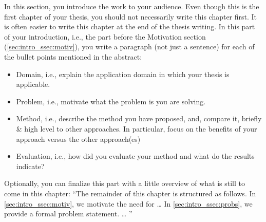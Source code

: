 In this section, you introduce the work to your audience.
Even though this is the first chapter of your thesis, you should not necessarily write this chapter first.
It is often easier to write this chapter at the end of the thesis writing.
In this part of your introduction, i.e., the part before the Motivation section (\autoref{sec:intro_ssec:motiv}), you write a paragraph (not just a sentence) for each of the bullet points mentioned in the abstract:

\begin{itemize}
	\item Domain, i.e., explain the application domain in which your thesis is applicable.
	\item Problem, i.e., motivate what the problem is you are solving.
	\item Method, i.e., describe the method you have proposed, and, compare it, briefly \& high level to other approaches. In particular, focus on the benefits of your approach versus the other approach(es)
	\item Evaluation, i.e., how did you evaluate your method and what do the results indicate?
\end{itemize}

Optionally, you can finalize this part with a little overview of what is still to come in this chapter:
\enquote{The remainder of this chapter is structured as follows.
In \autoref{sec:intro_ssec:motiv}, we motivate the need for \dots
In \autoref{sec:intro_ssec:probs}, we provide a formal problem statement.
\dots
}

